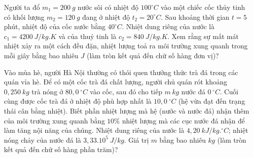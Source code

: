\begin{ex}%
	Người ta đổ $m_1 = 200\ g$ nước sôi có nhiệt độ $100^\circ C$ vào một chiếc cốc thủy tinh có khối lượng $m_2 = 120\ g$ đang ở nhiệt độ $t_2 = 20^\circ C$. Sau khoảng thời gian $t = 5$ phút, nhiệt độ của cốc nước bằng $40^\circ C$. Nhiệt dung riêng của nước là $c_1 = 4200\ J/kg.K$ và của thuỷ tinh là $c_2 = 840\ J/kg.K$. Xem rằng sự mất mát nhiệt xảy ra một cách đều đặn, nhiệt lượng toả ra môi trường xung quanh trong mỗi giây bằng bao nhiêu $J$ (làm tròn kết quả đến chữ số hàng đơn vị)?
\end{ex}

\begin{ex}%
	Vào mùa hè, người Hà Nội thường có thói quen thưởng thức trà đá trong các quán vỉa hè. Để có một cốc trà đá chất lượng, người chủ quán rót khoảng $0,250\ kg$ trà nóng ở $80,0\ ^{\circ}C$ vào cốc, sau đó cho tiếp $m\ kg$ nước đá $0\ ^{\circ}C$. Cuối cùng được cốc trà đá ở nhiệt độ phù hợp nhất là $10,0\ ^{\circ}C$ (hệ vừa đạt đến trạng thái cân bằng nhiệt). Biết phần nhiệt lượng mà hệ (nước và nước đá) nhận thêm của môi trường xung quanh bằng $10\%$ nhiệt lượng mà các cục nước đá nhận để làm tăng nội năng của chúng. Nhiệt dung riêng của nước là $4,20\ kJ/kg.^{\circ}C$; nhiệt nóng chảy của nước đá là $3,33.10^5\ J/kg$. Giá trị $m$ bằng bao nhiêu $kg$ (làm tròn kết quả đến chữ số hàng phần trăm)?
\end{ex}

